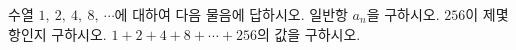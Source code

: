 수열 $1,\ 2,\ 4,\ 8,\ \cdots$에 대하여 다음 물음에 답하시오.
 일반항 $a_n$을 구하시오.
 $256$이 제몇 항인지 구하시오.
 $1+2+4+8+\cdots+256$의 값을 구하시오.

